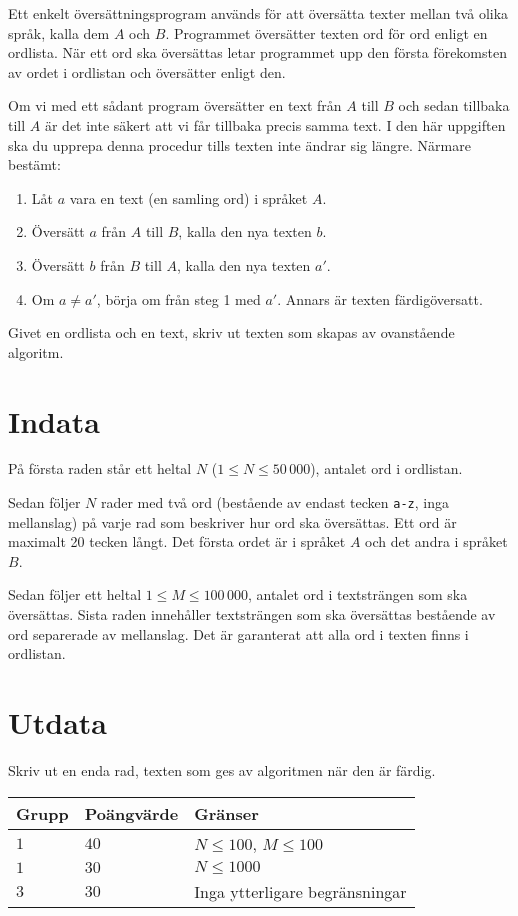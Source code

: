 Ett enkelt översättningsprogram används för att översätta texter mellan två
olika språk, kalla dem $A$ och $B$. Programmet översätter texten ord för ord enligt
en ordlista. När ett ord ska översättas letar programmet upp den första
förekomsten av ordet i ordlistan och översätter enligt den. 

Om vi med ett sådant program översätter en text från $A$ till $B$ och sedan tillbaka till $A$ är det inte säkert att vi får tillbaka precis samma text. I den här uppgiften ska du upprepa denna procedur tills texten inte ändrar sig längre. Närmare bestämt:
\begin{enumerate}
    \item Låt $a$ vara en text (en samling ord) i språket $A$.
    \item Översätt $a$ från $A$ till $B$, kalla den nya texten $b$.
    \item Översätt $b$ från $B$ till $A$, kalla den nya texten $a'$.
    \item Om $a \not = a'$, börja om från steg 1 med $a'$. Annars är texten färdigöversatt.
\end{enumerate}

Givet en ordlista och en text, skriv ut texten som skapas av ovanstående algoritm.

\section*{Indata}
På första raden står ett heltal $N$ ($1 \leq N \leq 50\,000$), antalet ord i ordlistan.

Sedan följer $N$ rader med två ord (bestående av endast tecken \texttt{a-z},
inga mellanslag) på varje rad som beskriver hur ord ska översättas. Ett ord är maximalt 20 tecken långt.
Det första ordet är i språket $A$ och det andra i språket $B$.

Sedan följer ett heltal $1 \leq M \leq 100\,000$,
antalet ord i textsträngen som ska översättas. Sista raden innehåller textsträngen som ska översättas
bestående av ord separerade av mellanslag. Det är garanterat
att alla ord i texten finns i ordlistan.

\section*{Utdata}
Skriv ut en enda rad, texten som ges av algoritmen när den är färdig.

\noindent
\begin{tabular}{| l | l | l |}
  \hline
  Grupp & Poängvärde & Gränser \\ \hline
  $1$   & $40$       & $N \leq 100$, $M \leq 100$ \\ \hline
  $1$   & $30$       & $N \leq 1000$ \\ \hline
  $3$   & $30$       & Inga ytterligare begränsningar \\ \hline
\end{tabular}

